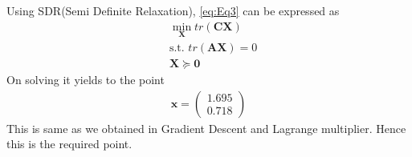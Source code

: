 \documentclass[12pt]{article}
\providecommand{\brak}[1]{\ensuremath{\left(#1\right)}}
\newcommand{\myvec}[1]{\ensuremath{\begin{pmatrix}#1\end{pmatrix}}}
\let\vec\mathbf
\begin{document}
Using SDR(Semi Definite Relaxation), \eqref{eq:Eq3} can be expressed as
\begin{align}
	& \min_{\vec{X}} tr\brak{\vec{C}\vec{X}}\\
	& \text{s.t. } tr\brak{\vec{A}\vec{X}} = 0\\
	& \vec{X} \succcurlyeq \vec{0}
\end{align}
On solving it yields to the point
\begin{align}
	\vec{x} = \myvec{1.695\\0.718}
\end{align}
This is same as we obtained in Gradient Descent and Lagrange multiplier. Hence this is the required point.
\end{document}

